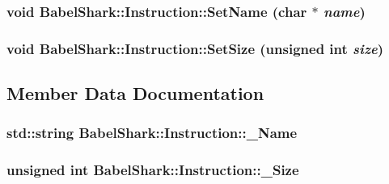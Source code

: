 \hypertarget{class_babel_shark_1_1_instruction_40c2bee9e484dcce78222c275030f3eb}{
\subsubsection[{SetName}]{\setlength{\rightskip}{0pt plus 5cm}void BabelShark::Instruction::SetName (char $\ast$ {\em name})}}
\label{class_babel_shark_1_1_instruction_40c2bee9e484dcce78222c275030f3eb}


\hypertarget{class_babel_shark_1_1_instruction_3ff4244bf92b6f03860be548b13a639e}{
\subsubsection[{SetSize}]{\setlength{\rightskip}{0pt plus 5cm}void BabelShark::Instruction::SetSize (unsigned int {\em size})}}
\label{class_babel_shark_1_1_instruction_3ff4244bf92b6f03860be548b13a639e}




\subsection{Member Data Documentation}
\hypertarget{class_babel_shark_1_1_instruction_5633af541e0014aa9797279b9ce387db}{
\subsubsection[{\_\-Name}]{\setlength{\rightskip}{0pt plus 5cm}std::string {\bf BabelShark::Instruction::\_\-Name}}}
\label{class_babel_shark_1_1_instruction_5633af541e0014aa9797279b9ce387db}


\hypertarget{class_babel_shark_1_1_instruction_fc2e2c16ce0c0430c1afa0ea0a420117}{
\subsubsection[{\_\-Size}]{\setlength{\rightskip}{0pt plus 5cm}unsigned int {\bf BabelShark::Instruction::\_\-Size}}}
\label{class_babel_shark_1_1_instruction_fc2e2c16ce0c0430c1afa0ea0a420117}


